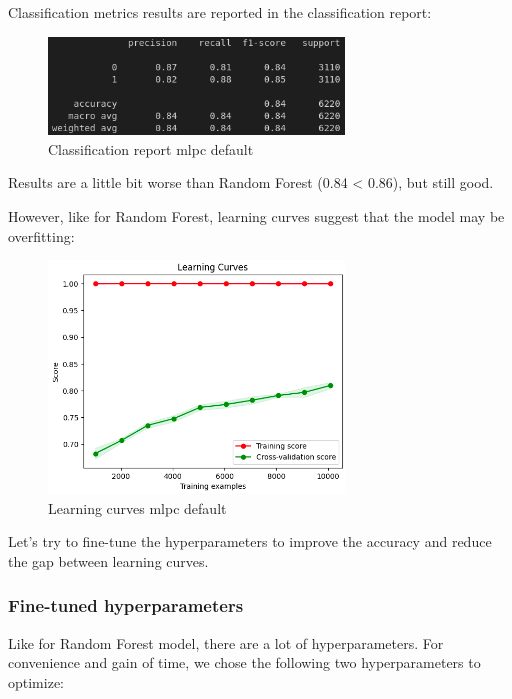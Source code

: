 \documentclass[a4paper,12pt]{article}
\begin{document}
Classification metrics results are reported in the classification report:

\begin{figure}[H]
  \centering
  \includegraphics[width=0.7\textwidth]{./images/report_mlpc_default.png}
  \caption{Classification report mlpc default}
  \label{fig:report_mlpc_default}
\end{figure}

Results are a little bit worse than Random Forest (0.84 < 0.86), but still good.

However, like for Random Forest, learning curves suggest that the model may be overfitting:

\begin{figure}[H]
  \centering
  \includegraphics[width=0.7\textwidth]{./images/lc_mlpc_default.png}
  \caption{Learning curves mlpc default}
  \label{fig:lc_mlpc_default}
\end{figure}

Let's try to fine-tune the hyperparameters to improve the accuracy and reduce the gap between learning curves.

\subsubsection{Fine-tuned hyperparameters}

Like for Random Forest model, there are a lot of hyperparameters. For convenience and gain of time, we chose the following two hyperparameters to optimize:
\end{document}

